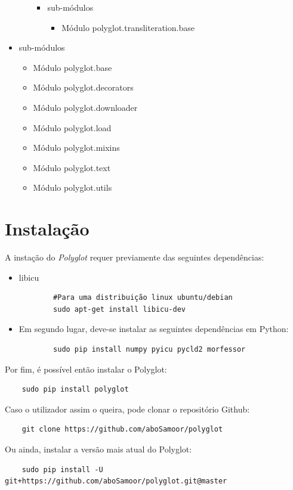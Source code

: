 \documentclass{article}
\begin{document}
\begin{itemize}
\begin{itemize}
        \begin{itemize}
            \item sub-módulos
            \begin{itemize}
                \item Módulo polyglot.transliteration.base
            \end{itemize}
        \end{itemize}
    \end{itemize}
    \item sub-módulos
    \begin{itemize}
        \item Módulo polyglot.base
        \item Módulo polyglot.decorators
        \item Módulo polyglot.downloader
        \item Módulo polyglot.load
        \item Módulo polyglot.mixins
        \item Módulo polyglot.text
        \item Módulo polyglot.utils
    \end{itemize}
\end{itemize}


\section{Instalação}

A instação do \textit{Polyglot} requer previamente das seguintes dependências:
\begin{itemize}
    \item libicu
    \begin{verbatim}
        #Para uma distribuição linux ubuntu/debian
        sudo apt-get install libicu-dev
    \end{verbatim}
    \item Em segundo lugar, deve-se instalar as seguintes dependências em Python:
    \begin{verbatim}
        sudo pip install numpy pyicu pycld2 morfessor
    \end{verbatim}
\end{itemize}
Por fim, é possível então instalar o Polyglot:
\begin{verbatim}
    sudo pip install polyglot
\end{verbatim}
Caso o utilizador assim o queira, pode clonar o repositório Github:
\begin{verbatim}
    git clone https://github.com/aboSamoor/polyglot
\end{verbatim}
Ou ainda, instalar a versão mais atual do Polyglot:
\begin{verbatim}
    sudo pip install -U git+https://github.com/aboSamoor/polyglot.git@master    
\end{verbatim}
\end{document}
